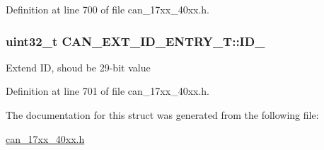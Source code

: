 Definition at line 700 of file can\+\_\+17xx\+\_\+40xx.\+h.

\subsubsection[{\texorpdfstring{I\+D\+\_\+29}{ID_29}}]{\setlength{\rightskip}{0pt plus 5cm}uint32\+\_\+t C\+A\+N\+\_\+\+E\+X\+T\+\_\+\+I\+D\+\_\+\+E\+N\+T\+R\+Y\+\_\+\+T\+::\+I\+D\+\_}\hypertarget{structCAN__EXT__ID__ENTRY__T_a3e67827310c81e3e17cb067dd25155b3}{}\label{structCAN__EXT__ID__ENTRY__T_a3e67827310c81e3e17cb067dd25155b3}
Extend ID, shoud be 29-\/bit value 

Definition at line 701 of file can\+\_\+17xx\+\_\+40xx.\+h.



The documentation for this struct was generated from the following file\+:\begin{DoxyCompactItemize}
\item 
\hyperlink{can__17xx__40xx_8h}{can\+\_\+17xx\+\_\+40xx.\+h}\end{DoxyCompactItemize}
